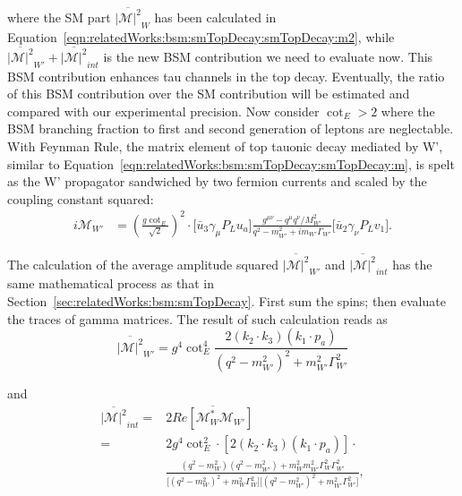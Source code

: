 \noindent where the SM part $\overline{ |\mathcal{M}|^2 } _{W} $  has been calculated in Equation~\ref{eqn:relatedWorks:bsm:smTopDecay:smTopDecay:m2}, while $\overline{ |\mathcal{M}|^2 } _{W'} +  \overline{ |\mathcal{M}|^2 } _{int}$ is the new BSM contribution we need to evaluate now. This BSM contribution enhances tau channels in the top decay. Eventually, the ratio of this BSM contribution over the SM contribution will be estimated and compared with our experimental precision. Now consider $\cot_E > 2$ where the BSM branching fraction to first and second generation of leptons are neglectable. With Feynman Rule, the matrix element of top tauonic decay mediated by W', similar to Equation~\ref{eqn:relatedWorks:bsm:smTopDecay:smTopDecay:m}, is spelt as the W' propagator sandwiched by two fermion currents and scaled by the coupling constant squared:
\begin{equation}
\begin{split}
	i \mathcal{M}_{W'}  & =  (\frac{g \cot_E}{\sqrt{2}})^2 \cdot 
	\big[ \bar{u}_3 \gamma_\mu P_L u_a \big] 
	\frac{g^{\mu \nu} - q^\mu q^\nu/M^2_{W'}}{q^2-m^2_{W'} + i m_{W'} \Gamma_{W'}} 
	\big[ \bar{u}_2 \gamma_\nu P_L v_1 \big] .
\end{split}
\end{equation}

\noindent The calculation of the average amplitude squared  $\overline{ |\mathcal{M}|^2 } _{W'} $ and $\overline{ |\mathcal{M}|^2 } _{int}$ has the same mathematical process as that in Section~\ref{sec:relatedWorks:bsm:smTopDecay}. First sum the spins; then evaluate the traces of gamma matrices. The result of such calculation reads as
\begin{equation}
	\overline{ |\mathcal{M}|^2 }_{W'} =  g^4 \cot_E^4 \frac{2  (  k_2 \cdot k_3) (  k_1 \cdot p_a) }{ (  q^2-m^2_{W'})^2 +  m^2_{W'} \Gamma^2_{W'} }  
\end{equation}

\noindent and
\begin{equation}
\begin{split}
    \overline{ |\mathcal{M}|^2 } _{int} = &   2 \overline{ Re[\mathcal{M}^*_W \mathcal{M}_{W'}] }  \\
    =& 2 g ^4\cot^2_E  \cdot  [2  (  k_2 \cdot k_3) (  k_1 \cdot p_a) ] \cdot \\
    &\frac 
    {( q^2-m^2_{W}) ( q^2-m^2_{W'}) + m^2_{W}  m^2_{W'}  \Gamma^2_{W} \Gamma^2_{W'} }
    { \big[ ( q^2-m^2_{W})^2 +  m^2_{W} \Gamma^2_{W} \big] \big[ (  q^2-m^2_{W'})^2 +  m^2_{W'} \Gamma^2_{W'} \big] }   
    ,
\end{split}
\end{equation}

